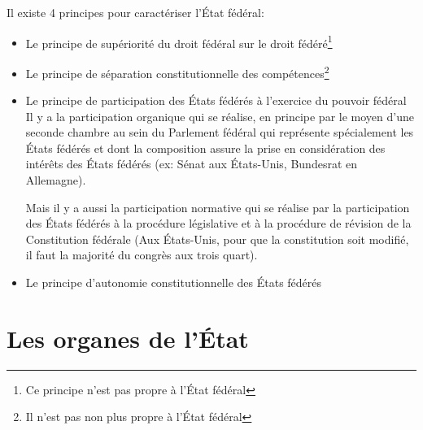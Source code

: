 \documentclass[12pt, a4paper, openany]{book}
\begin{document}
Il existe 4 principes pour caractériser l'État fédéral:
\begin{itemize}
\item Le principe de supériorité du droit fédéral sur le droit fédéré\footnote{Ce principe n'est pas propre à l'État fédéral}
\item Le principe de séparation constitutionnelle des compétences\footnote{Il n'est pas non plus propre à l'État fédéral}
\item Le principe de participation des États fédérés à l'exercice du pouvoir fédéral
Il y a la participation organique qui se réalise, en principe par le moyen d'une seconde chambre au sein du Parlement fédéral qui représente spécialement les États fédérés et dont la composition assure la prise en considération des intérêts des États fédérés (ex: Sénat aux États-Unis, Bundesrat en Allemagne).

Mais il y a aussi la participation normative qui se réalise par la participation des États fédérés à la procédure législative et à la procédure de révision de la Constitution fédérale (Aux États-Unis, pour que la constitution soit modifié, il faut la majorité du congrès aux trois quart).

\item Le principe d'autonomie constitutionnelle des États fédérés
\end{itemize}

\section{Les organes de l'État}
\end{document}
